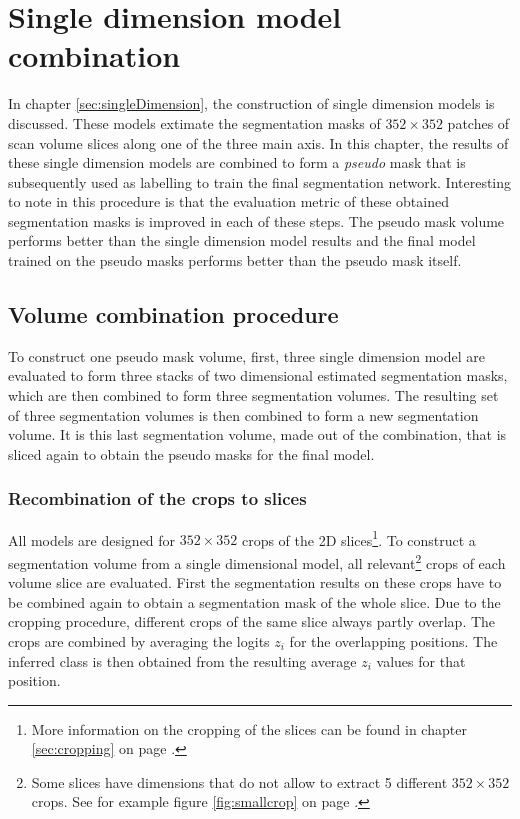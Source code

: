 \chapter{Single dimension model combination\label{sec:combination}}\thispagestyle{empty}
In chapter \ref{sec:singleDimension}, the construction of single dimension models is discussed.
These models extimate the segmentation masks of $352\times 352$ patches of scan volume slices along one of the three main axis.
In this chapter, the results of these single dimension models are combined to form a \textit{pseudo} mask that is subsequently used as labelling to train the final segmentation network.
Interesting to note in this procedure is that the evaluation metric of these obtained segmentation masks is improved in each of these steps.
The pseudo mask volume performs better than the single dimension model results and the final model trained on the pseudo masks performs better than the pseudo mask itself. 

\section{Volume combination procedure}
To construct one pseudo mask volume, first, three single dimension model are evaluated to form three stacks of two dimensional estimated segmentation masks, which are then combined to form three segmentation volumes. 
The resulting set of three segmentation volumes is then combined to form a new segmentation volume.
It is this last segmentation volume, made out of the combination, that is sliced again to obtain the pseudo masks for the final model.

\subsection{Recombination of the crops to slices}
All models are designed for $352 \times 352$ crops of the 2D slices\footnote{More information on the cropping of the slices can be found in chapter \ref{sec:cropping} on page \pageref{sec:cropping}.}.
To construct a segmentation volume from a single dimensional model, all relevant\footnote{Some slices have dimensions that do not allow to extract 5 different $352 \times 352$ crops. See for example figure \ref{fig:smallcrop} on page \pageref{fig:smallcrop}.} crops of each volume slice are evaluated.
First the segmentation results on these crops have to be combined again to obtain a segmentation mask of the whole slice.
Due to the cropping procedure, different crops of the same slice always partly overlap.
The crops are combined by averaging the logits $z_i$ for the overlapping positions.
The inferred class is then obtained from the resulting average $z_i$ values for that position. 

